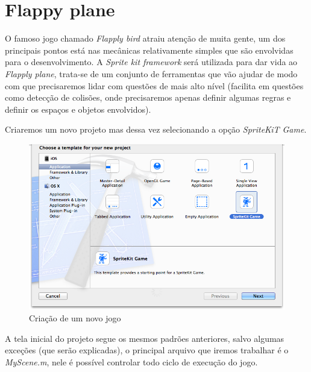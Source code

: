 \documentclass[a4paper,12pt,brazil,oneside]{book}
\begin{document}
\section{Flappy plane}

O famoso jogo chamado \emph{Flapply bird} atraiu atenção de muita gente, um dos principais pontos está nas mecânicas relativamente simples que são envolvidas para o desenvolvimento.
A \emph{Sprite kit framework} será utilizada para dar vida ao \emph{Flapply plane}, trata-se de um conjunto de ferramentas que vão ajudar de modo com que precisaremos lidar com questões de mais alto nível (facilita em questões como detecção de colisões, onde precisaremos apenas definir algumas regras e definir os espaços e objetos envolvidos).

Criaremos um novo projeto mas dessa vez selecionando a opção \emph{SpriteKiT Game}.

\begin{figure}[H]
  \centering
  \includegraphics[width=1\textwidth]{figuras/6/plane1.png}
  \caption{Criação de um novo jogo}
  \label{fig:a}
\end{figure}

A tela inicial do projeto segue os mesmos padrões anteriores, salvo algumas exceções (que serão explicadas), o principal arquivo que iremos trabalhar é o \emph{MyScene.m}, nele é possível controlar todo ciclo de execução do jogo.
\end{document}
